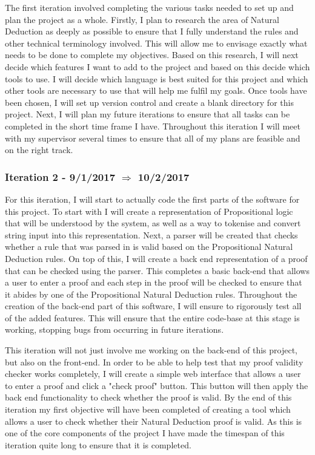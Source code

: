 The first iteration involved completing the various tasks needed to set up and plan the project as a whole. Firstly, I plan to research the area of Natural Deduction as deeply as possible to ensure that I fully understand the rules and other technical terminology involved. This will allow me to envisage exactly what needs to be done to complete my objectives. Based on this research, I will next decide which features I want to add to the project and based on this decide which tools to use. I will decide which language is best suited for this project and which other tools are necessary to use that will help me fulfil my goals. Once tools have been chosen, I will set up version control and create a blank directory for this project. Next, I will plan my future iterations to ensure that all tasks can be completed in the short time frame I have. Throughout this iteration I will meet with my supervisor several times to ensure that all of my plans are feasible and on the right track.

\subsubsection{Iteration 2 - 9/1/2017 $\Rightarrow$ 10/2/2017}

For this iteration, I will start to actually code the first parts of the software for this project. To start with I will create a representation of Propositional logic that will be understood by the system, as well as a way to tokenise and convert string input into this representation. Next, a parser will be created that checks whether a rule that was parsed in is valid based on the Propositional Natural Deduction rules. On top of this, I will create a back end representation of a proof that can be checked using the parser. This completes a basic back-end that allows a user to enter a proof and each step in the proof will be checked to ensure that it abides by one of the Propositional Natural Deduction rules. Throughout the creation of the back-end part of this software, I will ensure to rigorously test all of the added features. This will ensure that the entire code-base at this stage is working, stopping bugs from occurring in future iterations. 

This iteration will not just involve me working on the back-end of this project, but also on the front-end. In order to be able to help test that my proof validity checker works completely, I will create a simple web interface that allows a user to enter a proof and click a "check proof" button. This button will then apply the back end functionality to check whether the proof is valid. By the end of this iteration my first objective will have been completed of creating a tool which allows a user to check whether their Natural Deduction proof is valid. As this is one of the core components of the project I have made the timespan of this iteration quite long to ensure that it is completed.

